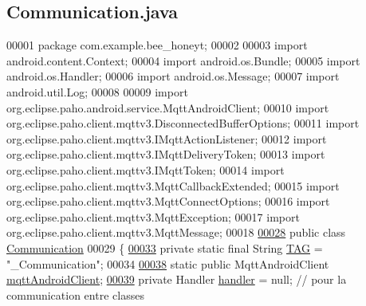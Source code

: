 \hypertarget{_communication_8java_source}{}\subsection{Communication.\+java}
\label{_communication_8java_source}

\begin{DoxyCode}
00001 \textcolor{keyword}{package }com.example.bee\_honeyt;
00002 
00003 \textcolor{keyword}{import} android.content.Context;
00004 \textcolor{keyword}{import} android.os.Bundle;
00005 \textcolor{keyword}{import} android.os.Handler;
00006 \textcolor{keyword}{import} android.os.Message;
00007 \textcolor{keyword}{import} android.util.Log;
00008 
00009 \textcolor{keyword}{import} org.eclipse.paho.android.service.MqttAndroidClient;
00010 \textcolor{keyword}{import} org.eclipse.paho.client.mqttv3.DisconnectedBufferOptions;
00011 \textcolor{keyword}{import} org.eclipse.paho.client.mqttv3.IMqttActionListener;
00012 \textcolor{keyword}{import} org.eclipse.paho.client.mqttv3.IMqttDeliveryToken;
00013 \textcolor{keyword}{import} org.eclipse.paho.client.mqttv3.IMqttToken;
00014 \textcolor{keyword}{import} org.eclipse.paho.client.mqttv3.MqttCallbackExtended;
00015 \textcolor{keyword}{import} org.eclipse.paho.client.mqttv3.MqttConnectOptions;
00016 \textcolor{keyword}{import} org.eclipse.paho.client.mqttv3.MqttException;
00017 \textcolor{keyword}{import} org.eclipse.paho.client.mqttv3.MqttMessage;
00018 
\hyperlink{classcom_1_1example_1_1bee__honeyt_1_1_communication}{00028} \textcolor{keyword}{public} \textcolor{keyword}{class }\hyperlink{classcom_1_1example_1_1bee__honeyt_1_1_communication}{Communication}
00029 \{
\hyperlink{classcom_1_1example_1_1bee__honeyt_1_1_communication_a848338dd9654af654c7e681742666785}{00033}     \textcolor{keyword}{private} \textcolor{keyword}{static} \textcolor{keyword}{final} String \hyperlink{classcom_1_1example_1_1bee__honeyt_1_1_communication_a848338dd9654af654c7e681742666785}{TAG} = \textcolor{stringliteral}{"\_Communication"};
00034 
\hyperlink{classcom_1_1example_1_1bee__honeyt_1_1_communication_a86db63a356e4638c1d39c54bbe64f0e1}{00038}     \textcolor{keyword}{static} \textcolor{keyword}{public} MqttAndroidClient \hyperlink{classcom_1_1example_1_1bee__honeyt_1_1_communication_a86db63a356e4638c1d39c54bbe64f0e1}{mqttAndroidClient};
\hyperlink{classcom_1_1example_1_1bee__honeyt_1_1_communication_add1a0705dba503c1c4c7a3168a571b20}{00039}     \textcolor{keyword}{private} Handler \hyperlink{classcom_1_1example_1_1bee__honeyt_1_1_communication_add1a0705dba503c1c4c7a3168a571b20}{handler} = null; \textcolor{comment}{// pour la communication entre classes}

\end{DoxyCode}
